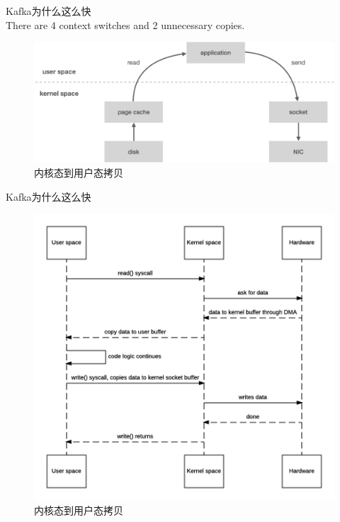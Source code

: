 \begin{frame}[plain,t]{Kafka为什么这么快} %
     \\  \vspace{2ex}
    There are 4 context switches and 2 unnecessary copies.
    
    \vspace{2ex}
    
    \begin{figure}
        \centering
        \includegraphics[width=0.9\linewidth]{image/0404}
        \caption{内核态到用户态拷贝}
        \label{fig:0404}
    \end{figure}
    
\end{frame}
\begin{frame}[plain,t]{Kafka为什么这么快} %
     \\  %

    
    \begin{figure}
        \centering
        \includegraphics[width=0.7\linewidth]{image/0407}
        \caption{内核态到用户态拷贝}
        \label{fig:0407}
    \end{figure}
    
    
    
\end{frame}
